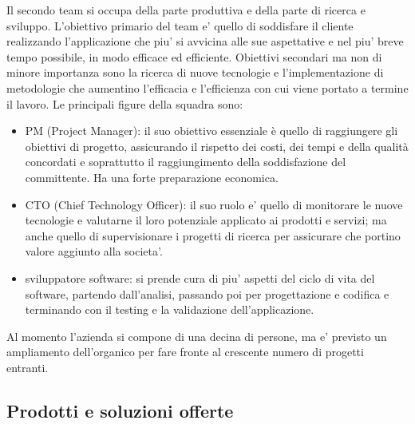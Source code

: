 Il secondo team si occupa della parte produttiva e della parte di ricerca e sviluppo. L'obiettivo primario del team e' quello di soddisfare il cliente realizzando l'applicazione che piu' si avvicina alle sue aspettative e nel piu' breve tempo possibile, in modo efficace ed efficiente. Obiettivi secondari ma non di minore importanza sono la ricerca di nuove tecnologie e l'implementazione di metodologie che aumentino l'efficacia e l'efficienza con cui viene portato a termine il lavoro.
Le principali figure della squadra sono:
\begin{itemize}
	\item PM (Project Manager): il suo obiettivo essenziale è quello di raggiungere gli obiettivi di progetto, assicurando il rispetto dei costi, dei tempi e della qualità concordati e soprattutto il raggiungimento della soddisfazione del committente. Ha una forte preparazione economica.
	\item CTO (Chief Technology Officer): il suo ruolo e' quello di monitorare le nuove tecnologie e valutarne il loro potenziale applicato ai prodotti e servizi; ma anche quello di supervisionare i progetti di ricerca per assicurare che portino valore aggiunto alla societa'.
	\item sviluppatore software:  si prende cura di piu' aspetti del ciclo di vita del software, partendo dall'analisi, passando poi per progettazione e codifica e terminando con il testing e la validazione dell'applicazione. 
\end{itemize} 

Al momento l'azienda si compone di una decina di persone, ma e' previsto un ampliamento dell'organico per fare fronte al crescente numero di progetti entranti.

\subsection{Prodotti e soluzioni offerte}
